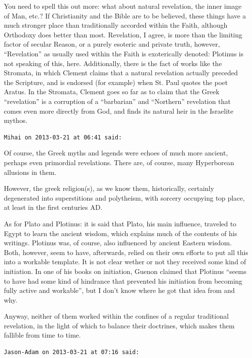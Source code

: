 \begin{footnotesize}
\begin{sffamily}
You need to spell this out more: what about natural revelation, the inner image of Man, etc.? If Christianity and the Bible are to be believed, these things have a much stronger place than traditionally accorded within the Faith, although Orthodoxy does better than most. Revelation, I agree, is more than the limiting factor of secular Reason, or a purely esoteric and private truth, however, ``Revelation'' as usually used within the Faith is exoterically denoted: Plotinus is not speaking of this, here. Additionally, there is the fact of works like the Stromata, in which Clement claims that a natural revelation actually preceded the Scripture, and is endorsed (for example) when St. Paul quotes the poet Aratus. In the Stromata, Clement goes so far as to claim that the Greek ``revelation'' is a corruption of a ``barbarian'' and ``Northern'' revelation that comes even more directly from God, and finds its natural heir in the Israelite mythos.

\hfill

\texttt{Mihai on 2013-03-21 at 06:41 said:}

Of course, the Greek myths and legends were echoes of much more ancient, perhaps even primordial revelations. There are, of course, many Hyperborean allusions in them.

However, the greek religion(s), as we know them, historically, certainly degenerated into superstitions and polytheism, with sorcery occupying top place, at least in the first centuries AD.

As for Plato and Plotinus: it is said that Plato, his main influence, traveled to Egypt to learn the ancient wisdom, which explains much of the contents of his writings. Plotinus was, of course, also influenced by ancient Eastern wisdom. Both, however, seem to have, afterwards, relied on their own efforts to put all this into a workable template. It is not clear wether or not they received some kind of initiation. In one of his books on initiation, Guenon claimed that Plotinus ``seems to have had some kind of hindrance that prevented his initiation from becoming fully active and workable'', but I don't know where he got that idea from and why.

Anyway, neither of them worked within the confines of a regular traditional revelation, in the light of which to balance their doctrines, which makes them fallible from time to time.

\hfill

\texttt{Jason-Adam on 2013-03-21 at 07:16 said:}


\end{sffamily}
\end{footnotesize}
